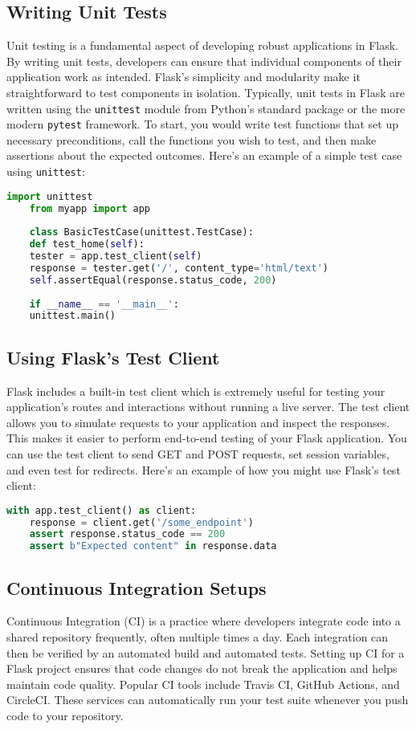 \subsection{Writing Unit Tests}
Unit testing is a fundamental aspect of developing robust applications in Flask. By writing unit tests, developers can ensure that individual components of their application work as intended. Flask's simplicity and modularity make it straightforward to test components in isolation. Typically, unit tests in Flask are written using the \texttt{unittest} module from Python's standard package or the more modern \texttt{pytest} framework. To start, you would write test functions that set up necessary preconditions, call the functions you wish to test, and then make assertions about the expected outcomes.\cite{stouffermastering:2015} Here's an example of a simple test case using \texttt{unittest}:

\begin{lstlisting}[language=Python]
	import unittest
	from myapp import app
	
	class BasicTestCase(unittest.TestCase):
	def test_home(self):
	tester = app.test_client(self)
	response = tester.get('/', content_type='html/text')
	self.assertEqual(response.status_code, 200)
	
	if __name__ == '__main__':
	unittest.main()
\end{lstlisting}

\subsection{Using Flask’s Test Client}
Flask includes a built-in test client which is extremely useful for testing your application’s routes and interactions without running a live server. The test client allows you to simulate requests to your application and inspect the responses. This makes it easier to perform end-to-end testing of your Flask application. You can use the test client to send GET and POST requests, set session variables, and even test for redirects.\cite{Flaskdocs:2024} Here’s an example of how you might use Flask’s test client:

\begin{lstlisting}[language=Python]
	with app.test_client() as client:
	response = client.get('/some_endpoint')
	assert response.status_code == 200
	assert b"Expected content" in response.data
\end{lstlisting}

\subsection{Continuous Integration Setups}
Continuous Integration (CI) is a practice where developers integrate code into a shared repository frequently, often multiple times a day. Each integration can then be verified by an automated build and automated tests. Setting up CI for a Flask project ensures that code changes do not break the application and helps maintain code quality. Popular CI tools include Travis CI, GitHub Actions, and CircleCI. These services can automatically run your test suite whenever you push code to your repository. \cite{stouffermastering:2015}

